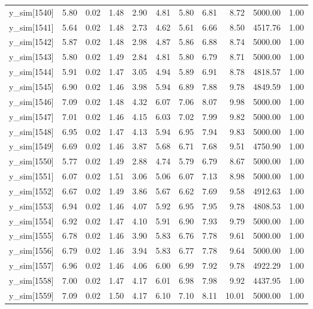 \begin{table}[ht]
\begin{tabular}{rrrrrrrrrrr}
  y\_sim[1540] & 5.80 & 0.02 & 1.48 & 2.90 & 4.81 & 5.80 & 6.81 & 8.72 & 5000.00 & 1.00 \\ 
  y\_sim[1541] & 5.64 & 0.02 & 1.48 & 2.73 & 4.62 & 5.61 & 6.66 & 8.50 & 4517.76 & 1.00 \\ 
  y\_sim[1542] & 5.87 & 0.02 & 1.48 & 2.98 & 4.87 & 5.86 & 6.88 & 8.74 & 5000.00 & 1.00 \\ 
  y\_sim[1543] & 5.80 & 0.02 & 1.49 & 2.84 & 4.81 & 5.80 & 6.79 & 8.71 & 5000.00 & 1.00 \\ 
  y\_sim[1544] & 5.91 & 0.02 & 1.47 & 3.05 & 4.94 & 5.89 & 6.91 & 8.78 & 4818.57 & 1.00 \\ 
  y\_sim[1545] & 6.90 & 0.02 & 1.46 & 3.98 & 5.94 & 6.89 & 7.88 & 9.78 & 4849.59 & 1.00 \\ 
  y\_sim[1546] & 7.09 & 0.02 & 1.48 & 4.32 & 6.07 & 7.06 & 8.07 & 9.98 & 5000.00 & 1.00 \\ 
  y\_sim[1547] & 7.01 & 0.02 & 1.46 & 4.15 & 6.03 & 7.02 & 7.99 & 9.82 & 5000.00 & 1.00 \\ 
  y\_sim[1548] & 6.95 & 0.02 & 1.47 & 4.13 & 5.94 & 6.95 & 7.94 & 9.83 & 5000.00 & 1.00 \\ 
  y\_sim[1549] & 6.69 & 0.02 & 1.46 & 3.87 & 5.68 & 6.71 & 7.68 & 9.51 & 4750.90 & 1.00 \\ 
  y\_sim[1550] & 5.77 & 0.02 & 1.49 & 2.88 & 4.74 & 5.79 & 6.79 & 8.67 & 5000.00 & 1.00 \\ 
  y\_sim[1551] & 6.07 & 0.02 & 1.51 & 3.06 & 5.06 & 6.07 & 7.13 & 8.98 & 5000.00 & 1.00 \\ 
  y\_sim[1552] & 6.67 & 0.02 & 1.49 & 3.86 & 5.67 & 6.62 & 7.69 & 9.58 & 4912.63 & 1.00 \\ 
  y\_sim[1553] & 6.94 & 0.02 & 1.46 & 4.07 & 5.92 & 6.95 & 7.95 & 9.78 & 4808.53 & 1.00 \\ 
  y\_sim[1554] & 6.92 & 0.02 & 1.47 & 4.10 & 5.91 & 6.90 & 7.93 & 9.79 & 5000.00 & 1.00 \\ 
  y\_sim[1555] & 6.78 & 0.02 & 1.46 & 3.90 & 5.83 & 6.76 & 7.78 & 9.61 & 5000.00 & 1.00 \\ 
  y\_sim[1556] & 6.79 & 0.02 & 1.46 & 3.94 & 5.83 & 6.77 & 7.78 & 9.64 & 5000.00 & 1.00 \\ 
  y\_sim[1557] & 6.96 & 0.02 & 1.46 & 4.06 & 6.00 & 6.99 & 7.92 & 9.78 & 4922.29 & 1.00 \\ 
  y\_sim[1558] & 7.00 & 0.02 & 1.47 & 4.17 & 6.01 & 6.98 & 7.98 & 9.92 & 4437.95 & 1.00 \\ 
  y\_sim[1559] & 7.09 & 0.02 & 1.50 & 4.17 & 6.10 & 7.10 & 8.11 & 10.01 & 5000.00 & 1.00 \\ 

\end{tabular}
\end{table}
